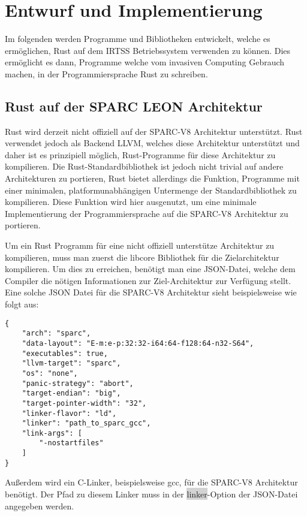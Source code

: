 \chapter{Entwurf und Implementierung}\label{sec:impl}


Im folgenden werden Programme und Bibliotheken entwickelt, welche es ermöglichen, Rust auf dem IRTSS Betriebssystem
verwenden zu können. Dies ermöglicht es dann, Programme welche vom invasiven Computing Gebrauch machen, in der
Programmiersprache Rust zu schreiben.

\section{Rust auf der SPARC LEON Architektur}

Rust wird derzeit nicht offiziell auf der SPARC-V8 Architektur unterstützt. Rust verwendet jedoch als Backend LLVM,
welches diese Architektur unterstützt und daher ist es prinzipiell möglich, Rust-Programme für diese Architektur zu kompilieren.
Die Rust-Standardbibliothek ist jedoch nicht trivial auf andere Architekturen zu portieren, Rust bietet allerdings die Funktion,
Programme mit einer minimalen, platformunabhängigen Untermenge der Standardbibliothek zu kompilieren. Diese Funktion wird hier
ausgenutzt, um eine minimale Implementierung der Programmiersprache auf die SPARC-V8 Architektur zu portieren.



Um ein Rust Programm für eine nicht offiziell unterstütze Architektur zu kompilieren, muss man zuerst die libcore Bibliothek
für die Zielarchitektur kompilieren. Um dies zu erreichen, benötigt man eine JSON-Datei, welche
dem Compiler die nötigen Informationen zur Ziel-Architektur zur Verfügung stellt. Eine solche JSON Datei für die
SPARC-V8 Architektur sieht beispielsweise wie folgt aus\cite{initialSparcSupportGithub}:
\begin{verbatim}
{
    "arch": "sparc",
    "data-layout": "E-m:e-p:32:32-i64:64-f128:64-n32-S64",
    "executables": true,
    "llvm-target": "sparc",
    "os": "none",
    "panic-strategy": "abort",
    "target-endian": "big",
    "target-pointer-width": "32",
    "linker-flavor": "ld",
    "linker": "path_to_sparc_gcc",
    "link-args": [
        "-nostartfiles"
    ]
}
\end{verbatim}
Außerdem wird ein C-Linker, beispielsweise gcc, für die SPARC-V8 Architektur benötigt. Der Pfad zu diesem Linker
muss in der \colorbox{lightgray}{linker}-Option der JSON-Datei angegeben werden.


